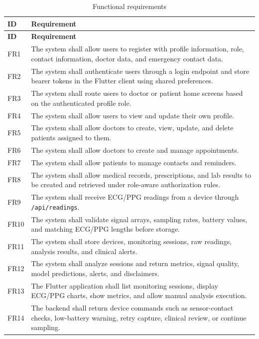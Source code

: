 \begin{longtable}{p{} p{}}
\caption{Functional requirements}\\
\toprule
\textbf{ID} & \textbf{Requirement}\\
\midrule
\endfirsthead
\toprule
\textbf{ID} & \textbf{Requirement}\\
\midrule
\endhead
FR1 & The system shall allow users to register with profile information, role, contact information, doctor data, and emergency contact data.\\
FR2 & The system shall authenticate users through a login endpoint and store bearer tokens in the Flutter client using shared preferences.\\
FR3 & The system shall route users to doctor or patient home screens based on the authenticated profile role.\\
FR4 & The system shall allow users to view and update their own profile.\\
FR5 & The system shall allow doctors to create, view, update, and delete patients assigned to them.\\
FR6 & The system shall allow doctors to create and manage appointments.\\
FR7 & The system shall allow patients to manage contacts and reminders.\\
FR8 & The system shall allow medical records, prescriptions, and lab results to be created and retrieved under role-aware authorization rules.\\
FR9 & The system shall receive ECG/PPG readings from a device through \texttt{/api/readings}.\\
FR10 & The system shall validate signal arrays, sampling rates, battery values, and matching ECG/PPG lengths before storage.\\
FR11 & The system shall store devices, monitoring sessions, raw readings, analysis results, and clinical alerts.\\
FR12 & The system shall analyze sessions and return metrics, signal quality, model predictions, alerts, and disclaimers.\\
FR13 & The Flutter application shall list monitoring sessions, display ECG/PPG charts, show metrics, and allow manual analysis execution.\\
FR14 & The backend shall return device commands such as sensor-contact checks, low-battery warning, retry capture, clinical review, or continue sampling.\\
\bottomrule
\end{longtable}

